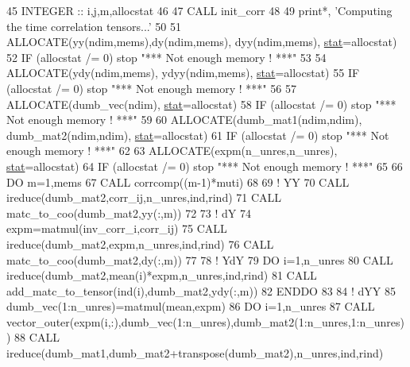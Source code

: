 \begin{DoxyCode}
45     \textcolor{keywordtype}{INTEGER} :: i,j,m,allocstat
46 
47     \textcolor{keyword}{CALL }init\_corr
48 
49     print*, \textcolor{stringliteral}{'Computing the time correlation tensors...'}
50     
51     \textcolor{keyword}{ALLOCATE}(yy(ndim,mems),dy(ndim,mems), dyy(ndim,mems), \hyperlink{namespacestat}{stat}=allocstat)
52     \textcolor{keywordflow}{IF} (allocstat /= 0) stop \textcolor{stringliteral}{"*** Not enough memory ! ***"}
53 
54     \textcolor{keyword}{ALLOCATE}(ydy(ndim,mems), ydyy(ndim,mems), \hyperlink{namespacestat}{stat}=allocstat)
55     \textcolor{keywordflow}{IF} (allocstat /= 0) stop \textcolor{stringliteral}{"*** Not enough memory ! ***"}
56 
57     \textcolor{keyword}{ALLOCATE}(dumb\_vec(ndim), \hyperlink{namespacestat}{stat}=allocstat)
58     \textcolor{keywordflow}{IF} (allocstat /= 0) stop \textcolor{stringliteral}{"*** Not enough memory ! ***"}
59 
60     \textcolor{keyword}{ALLOCATE}(dumb\_mat1(ndim,ndim), dumb\_mat2(ndim,ndim), \hyperlink{namespacestat}{stat}=allocstat)
61     \textcolor{keywordflow}{IF} (allocstat /= 0) stop \textcolor{stringliteral}{"*** Not enough memory ! ***"}
62 
63     \textcolor{keyword}{ALLOCATE}(expm(n\_unres,n\_unres), \hyperlink{namespacestat}{stat}=allocstat)
64     \textcolor{keywordflow}{IF} (allocstat /= 0) stop \textcolor{stringliteral}{"*** Not enough memory ! ***"}
65 
66     \textcolor{keywordflow}{DO} m=1,mems
67        \textcolor{keyword}{CALL }corrcomp((m-1)*muti)
68        
69        \textcolor{comment}{! YY}
70        \textcolor{keyword}{CALL }ireduce(dumb\_mat2,corr\_ij,n\_unres,ind,rind)
71        \textcolor{keyword}{CALL }matc\_to\_coo(dumb\_mat2,yy(:,m))
72 
73        \textcolor{comment}{! dY}
74        expm=matmul(inv\_corr\_i,corr\_ij)
75        \textcolor{keyword}{CALL }ireduce(dumb\_mat2,expm,n\_unres,ind,rind)
76        \textcolor{keyword}{CALL }matc\_to\_coo(dumb\_mat2,dy(:,m))
77 
78        \textcolor{comment}{! YdY}
79        \textcolor{keywordflow}{DO} i=1,n\_unres
80           \textcolor{keyword}{CALL }ireduce(dumb\_mat2,mean(i)*expm,n\_unres,ind,rind)
81           \textcolor{keyword}{CALL }add\_matc\_to\_tensor(ind(i),dumb\_mat2,ydy(:,m))
82 \textcolor{keywordflow}{       ENDDO}
83 
84        \textcolor{comment}{! dYY}
85        dumb\_vec(1:n\_unres)=matmul(mean,expm)
86        \textcolor{keywordflow}{DO} i=1,n\_unres
87           \textcolor{keyword}{CALL }vector\_outer(expm(i,:),dumb\_vec(1:n\_unres),dumb\_mat2(1:n\_unres,1:n\_unres))
88           \textcolor{keyword}{CALL }ireduce(dumb\_mat1,dumb\_mat2+transpose(dumb\_mat2),n\_unres,ind,rind)

\end{DoxyCode}
